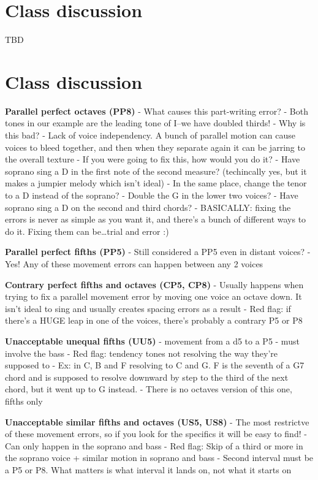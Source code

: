 \documentclass{book}
\begin{document}
\hypertarget{class-discussion-47}{%
\chapter{Class discussion}\label{class-discussion-47}}

TBD

\hypertarget{class-discussion-48}{%
\chapter{Class discussion}\label{class-discussion-48}}

\textbf{Parallel perfect octaves (PP8)} - What causes this part-writing error?
- Both tones in our example are the leading tone of I--we have doubled thirds!
- Why is this bad? - Lack of voice independency. A bunch of parallel motion
can cause voices to bleed together, and then when they separate again it can
be jarring to the overall texture - If you were going to fix this, how would
you do it? - Have soprano sing a D in the first note of the second measure?
(techincally yes, but it makes a jumpier melody which isn't ideal) - In the
same place, change the tenor to a D instead of the soprano? - Double the G in
the lower two voices? - Have soprano sing a D on the second and third chords?
- BASICALLY: fixing the errors is never as simple as you want it, and there's
a bunch of different ways to do it. Fixing them can be\ldots trial and error
:)

\textbf{Parallel perfect fifths (PP5)} - Still considered a PP5 even in
distant voices? - Yes! Any of these movement errors can happen between any 2
voices

\textbf{Contrary perfect fifths and octaves (CP5, CP8)} - Usually happens when
trying to fix a parallel movement error by moving one voice an octave down. It
isn't ideal to sing and usually creates spacing errors as a result - Red flag:
if there's a HUGE leap in one of the voices, there's probably a contrary P5 or
P8

\textbf{Unacceptable unequal fifths (UU5)} - movement from a d5 to a P5 - must
involve the bass - Red flag: tendency tones not resolving the way they're
supposed to - Ex: in C, B and F resolving to C and G. F is the seventh of a G7
chord and is supposed to resolve downward by step to the third of the next
chord, but it went up to G instead. - There is no octaves version of this one,
fifths only

\textbf{Unacceptable similar fifths and octaves (US5, US8)} - The most
restrictve of these movement errors, so if you look for the specifics it will
be easy to find! - Can only happen in the soprano and bass - Red flag: Skip of
a third or more in the soprano voice + similar motion in soprano and bass -
Second interval must be a P5 or P8. What matters is what interval it lands on,
not what it starts on
\end{document}
